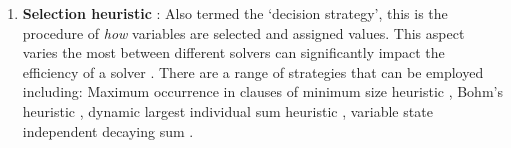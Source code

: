 \documentclass[11pt, a4paper, oneside]{report} %
\begin{document}
\begin{enumerate}


  \item \textbf{Selection heuristic} : \indent Also termed the `decision
strategy', this is the procedure of \textit{how} variables are selected and
assigned values. This aspect varies the most between different solvers can
significantly impact the efficiency of a solver
\cite{marques1999impact,gomes2008satisfiability, zhang2002quest}. There are a
range of strategies that can be employed including: Maximum occurrence in
clauses of minimum size heuristic \cite{jeroslow1990solving}, Bohm's heuristic
\cite{marques1999impact}, dynamic largest individual sum heuristic
\cite{marques1999grasp}, variable state independent decaying sum
\cite{moskewicz2001chaff}.









\end{enumerate}
\end{document}
